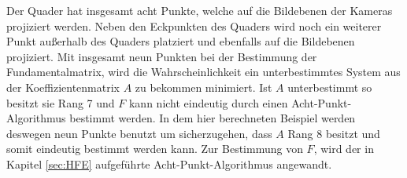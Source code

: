 Der Quader hat insgesamt acht Punkte, welche auf die Bildebenen der Kameras projiziert werden. Neben den Eckpunkten des Quaders wird noch ein weiterer Punkt außerhalb des Quaders platziert und ebenfalls auf die Bildebenen projiziert. Mit insgesamt neun Punkten bei der Bestimmung der Fundamentalmatrix, wird die Wahrscheinlichkeit ein unterbestimmtes System aus der Koeffizientenmatrix $A$ zu bekommen minimiert. Ist $A$ unterbestimmt so besitzt sie Rang 7 und $F$ kann nicht eindeutig durch einen Acht-Punkt-Algorithmus bestimmt werden\cite{HZ,LongQuan}. In dem hier berechneten Beispiel werden deswegen neun Punkte benutzt um sicherzugehen, dass $A$ Rang 8 besitzt und somit eindeutig bestimmt werden kann. Zur Bestimmung von $F$, wird der in Kapitel \ref{sec:HFE} aufgeführte Acht-Punkt-Algorithmus angewandt.\\





